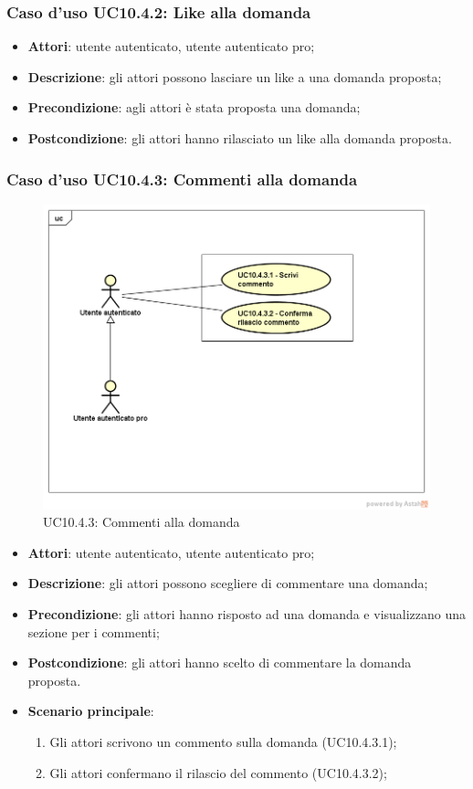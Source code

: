 \subsubsection{Caso d'uso UC10.4.2: Like alla domanda}
	\begin{itemize}
		\item \textbf{Attori}: utente autenticato, utente autenticato pro;
		\item \textbf{Descrizione}: gli attori possono lasciare un like a una domanda proposta;
		\item \textbf{Precondizione}: agli attori è stata proposta una domanda;
		\item \textbf{Postcondizione}: gli attori hanno rilasciato un like alla domanda proposta.
	\end{itemize}
\subsubsection{Caso d'uso UC10.4.3: Commenti alla domanda}
\label{UC10.4.3}
\begin{figure}
	\centering
	\includegraphics[scale=0.5]{UML/UC10_4_3.png}
	\caption{UC10.4.3: Commenti alla domanda}
\end{figure}
	\begin{itemize}
		\item \textbf{Attori}: utente autenticato, utente autenticato pro;
		\item \textbf{Descrizione}: gli attori possono scegliere di commentare una domanda;
		\item \textbf{Precondizione}: gli attori hanno risposto ad una domanda e visualizzano una sezione per i commenti;
		\item \textbf{Postcondizione}: gli attori hanno scelto di commentare la domanda proposta.
		\item \textbf{Scenario principale}:
			\begin{enumerate}
				\item Gli attori scrivono un commento sulla domanda (UC10.4.3.1);
				\item Gli attori confermano il rilascio del commento (UC10.4.3.2);
			\end{enumerate}
	\end{itemize}
